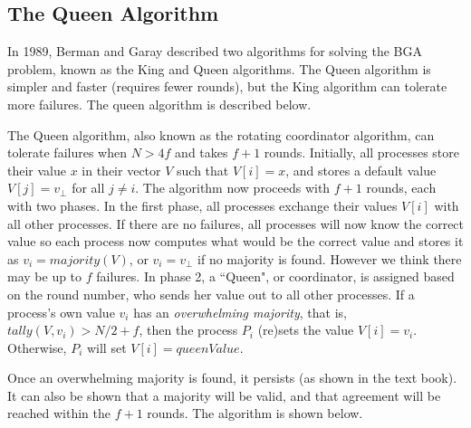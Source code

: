\documentclass[twoside]{article}
\begin{document}
\subsection{The Queen Algorithm}
In 1989, Berman and Garay \cite{Berman:1989:AOD:646243.681443, Berman:1989:TOD:1398514.1398724} described two algorithms for solving the BGA problem, known as the King and Queen algorithms. The Queen algorithm is simpler and faster (requires fewer rounds), but the King algorithm can tolerate more failures. The queen algorithm is described below.

The Queen algorithm, also known as the rotating coordinator algorithm, can tolerate failures when $N > 4f$ and takes $f+1$ rounds. Initially, all processes store their value $x$ in their vector $V$ such that $V[i] = x$, and stores a default value $V[j]=v_\perp$ for all $j\neq i$. The algorithm now proceeds with $f+1$ rounds, each with two phases. In the first phase, all processes exchange their values $V[i]$ with all other processes. If there are no failures, all processes will now know the correct value so each process now computes what would be the correct value and stores it as $v_i = majority(V)$, or $v_i = v_\perp$ if no majority is found. However we think there may be up to $f$ failures. In phase 2, a ``Queen", or coordinator, is assigned based on the round number, who sends her value out to all other processes. If a process's own value $v_i$ has an \textit{overwhelming majority}, that is, $tally(V,v_i) > N/2 + f$, then the process $P_i$ (re)sets the value $V[i] = v_i$. Otherwise, $P_i$ will set $V[i] = queenValue$.

Once an overwhelming majority is found, it persists (as shown in the text book). It can also be shown that a majority will be valid, and that agreement will be reached within the $f+1$ rounds. The algorithm is shown below.
\end{document}
